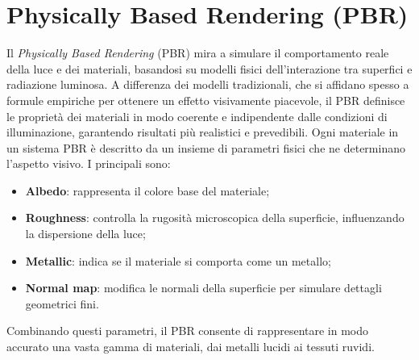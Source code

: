 \documentclass[12pt,a4paper,openright,twoside]{book}
\begin{document}
\section{Physically Based Rendering (PBR)}
Il \emph{Physically Based Rendering} (PBR) mira a simulare il comportamento reale della luce e dei materiali,
basandosi su modelli fisici dell'interazione tra superfici e radiazione luminosa. A differenza dei modelli
tradizionali, che si affidano spesso a formule empiriche per ottenere un effetto visivamente piacevole, il PBR
definisce le proprietà dei materiali in modo coerente e indipendente dalle condizioni di illuminazione,
garantendo risultati più realistici e prevedibili.
Ogni materiale in un sistema PBR è descritto da un insieme di parametri fisici che ne determinano l'aspetto visivo.
I principali sono:
\begin{itemize}
   \item \textbf{Albedo}: rappresenta il colore base del materiale;
   \item \textbf{Roughness}: controlla la rugosità microscopica della superficie, influenzando la dispersione della luce;
   \item \textbf{Metallic}: indica se il materiale si comporta come un metallo;
   \item \textbf{Normal map}: modifica le normali della superficie per simulare dettagli geometrici fini.
\end{itemize}
Combinando questi parametri, il PBR consente di rappresentare in modo accurato una vasta gamma di materiali,
dai metalli lucidi ai tessuti ruvidi.
\end{document}
